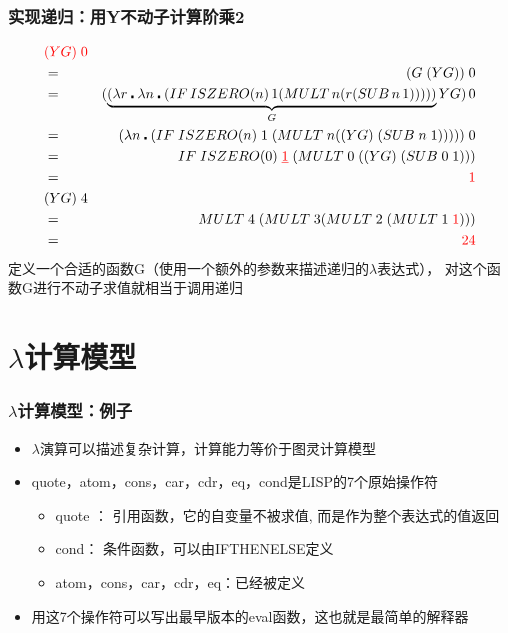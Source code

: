 \documentclass[CJKutf8,compress,hyperref]{beamer}
\begin{document}
\begin{CJK}{UTF8}{song}
\begin{frame}
  \frametitle{实现递归：用Y不动子计算阶乘2} 
  \begin{eqnarray*} 
    & {\color{red}(YG) \; 0} &    \\
    & =  & (G \; (YG)) \; 0 \\  
    & = & (\underbrace{(\lambda r \centerdot \lambda n \centerdot  (IF \, ISZERO(n) \, 1 (MULT \, n (r (SUB \, n \,1)))))}_G YG) \, 0 \\
    & =  & (\lambda n \centerdot (IF \; ISZERO(n) \; 1 \; (MULT \; n ((YG) \; (SUB \; n \; 1))))) \;0 \\
    & = & IF \; ISZERO(0) \; {\color{red}\underline{1}} \; (MULT \; 0 \; ((YG) \; (SUB \;0 \;1))) \\ 
    & =  & {\color{red}1} \\
    & (YG) \; 4 &  \\ 
    & = &  MULT \; 4 \; (MULT \; 3 (MULT \; 2 \; (MULT \; 1 \; {\color{red}1}))) \\ 
    & =  & {\color{red}24}
  \end{eqnarray*} 
  {\color{red}定义一个合适的函数G（使用一个额外的参数来描述递归的$\lambda$表达式）， 对这个函数G进行不动子求值就相当于调用递归}
\end{frame}

\section{$\lambda$计算模型}

\begin{frame}
  \frametitle{$\lambda$计算模型：例子} 
  \begin{itemize}
  \item $\lambda$演算可以描述复杂计算，计算能力等价于图灵计算模型 
  \item quote，atom，cons，car，cdr，eq，cond是LISP的7个原始操作符 
    \begin{itemize}
    \item quote ： 引用函数，它的自变量不被求值, 而是作为整个表达式的值返回
    \item cond： 条件函数，可以由IFTHENELSE定义
    \item atom，cons，car，cdr，eq：已经被定义
    \end{itemize}
  \item 用这7个操作符可以写出最早版本的eval函数，这也就是最简单的{\color{red}解释器}\cite{RootsOfLisp}
  \end{itemize}
\end{frame} 


\end{CJK}
\end{document}
